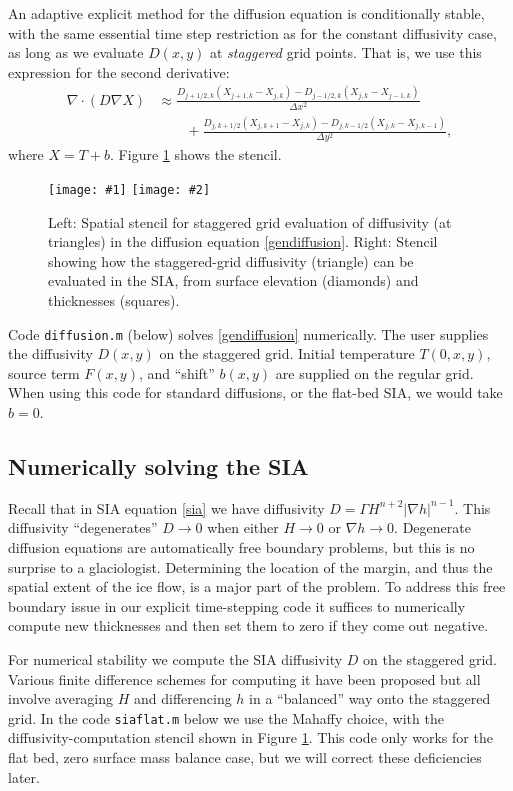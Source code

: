 \documentclass[letterpaper,final,12pt,reqno]{amsart}
\newcommand{\grad}{\nabla}
\newcommand{\Div}{\nabla\cdot}
\newcommand{\minput}[1]{
\vspace{0.8cm}
\VerbatimInput[frame=single,framesep=3mm,label=\fbox{\normalsize \textsl{\,#1.m\,}},fontfamily=courier,fontsize=\footnotesize]{../mfiles/#1.slim.m}
\vspace{0.5cm}
}
\newcommand{\twofigsizes}[5]{
\begin{figure}[ht]
\centering
\texttt{[image: \#1]} \quad
\texttt{[image: \#2]}
\caption{#3}
\label{fig:#1}
\end{figure}}
\begin{document}
\minput{diffusion}

An adaptive explicit method for the diffusion equation is conditionally stable, with the same essential time step restriction as for the constant diffusivity case, as long as we evaluate $D(x,y)$ at \emph{staggered} grid points.  That is, we use this expression for the second derivative:
\begin{align*}
\Div \left(D \grad X\right) &\approx \frac{D_{j+1/2,k}(X_{j+1,k} - X_{j,k}) - D_{j-1/2,k}(X_{j,k} - X_{j-1,k})}{\Delta x^2} \\
	&\qquad + \frac{D_{j,k+1/2}(X_{j,k+1} - X_{j,k}) - D_{j,k-1/2}(X_{j,k} - X_{j,k-1})}{\Delta y^2},
\end{align*}
where $X=T+b$.  Figure \ref{fig:diffstencil} shows the stencil.

\twofigsizes{diffstencil}{mahaffystencil}{Left:  Spatial stencil for staggered grid evaluation of diffusivity (at triangles) in the diffusion equation \eqref{gendiffusion}.  Right: Stencil showing how the staggered-grid diffusivity (triangle) can be evaluated in the SIA, from surface elevation (diamonds) and thicknesses (squares).}{2.2in}{2.2in}

Code \texttt{diffusion.m} (below) solves \eqref{gendiffusion} numerically.  The user supplies the diffusivity $D(x,y)$ on the staggered grid.  Initial temperature $T(0,x,y)$, source term $F(x,y)$, and ``shift'' $b(x,y)$ are supplied on the regular grid.  When using this code for standard diffusions, or the flat-bed SIA, we would take $b=0$.


\subsection{Numerically solving the SIA} \label{sec:numericalsia}

Recall that in SIA equation \eqref{sia} we have diffusivity $D = \Gamma H^{n+2} |\grad h|^{n-1}$.  This diffusivity ``degenerates'' $D \to 0$ when either $H\to 0$ or $\grad h \to 0$.  Degenerate diffusion equations are automatically free boundary problems, but this is no surprise to a glaciologist.  Determining the location of the margin, and thus the spatial extent of the ice flow, is a major part of the problem.  To address this free boundary issue in our explicit time-stepping code it suffices to numerically compute new thicknesses and then set them to zero if they come out negative.

For numerical stability we compute the SIA diffusivity $D$ on the staggered grid.  Various finite difference schemes for computing it have been proposed but all involve averaging $H$ and differencing $h$ in a ``balanced'' way onto the staggered grid.  In the code \texttt{siaflat.m} below we use the Mahaffy choice, with the diffusivity-computation stencil shown in Figure \ref{fig:diffstencil}.  This code only works for the flat bed, zero surface mass balance case, but we will correct these deficiencies later.
\end{document}
